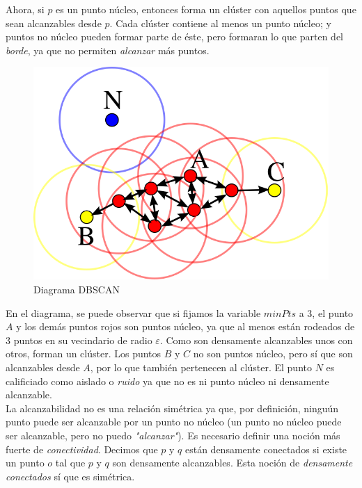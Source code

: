 \documentclass[a4paper, 12pt]{article}
\begin{document}
Ahora, si $p$ es un punto n\'ucleo, entonces forma un cl\'uster con aquellos puntos que sean alcanzables desde $p$. Cada cl\'uster contiene al menos un punto n\'ucleo; y puntos no n\'ucleo pueden formar parte de \'este, pero formaran lo que parten del \textit{borde}, ya que no permiten \textit{alcanzar} m\'as puntos. \\

\begin{figure}\label{fig:DBSCAN}
	\centering
	\includegraphics[scale=.5]{DBSCAN.png}
\caption{Diagrama DBSCAN}
\end{figure}

En el diagrama, se puede observar que si fijamos la variable $minPts$ a 3, el punto $A$ y los dem\'as puntos rojos son puntos n\'ucleo, ya que al menos est\'an rodeados de $3$ puntos en su vecindario de radio $\varepsilon$. Como son densamente alcanzables unos con otros, forman un cl\'uster. Los puntos $B$ y $C$ no son puntos n\'ucleo, pero s\'i que son alcanzables desde $A$, por lo que tambi\'en pertenecen al cl\'uster. El punto $N$ es calificiado como aislado o \textit{ruido} ya que no es ni punto n\'ucleo ni densamente alcanzable. \\

La alcanzabilidad no es una relaci\'on sim\'etrica ya que, por definici\'on, ningu\'un punto puede ser alcanzable por un punto no n\'ucleo (un punto no n\'ucleo puede ser alcanzable, pero no puedo \textit{"alcanzar"}). Es necesario definir una noci\'on m\'as fuerte de \textit{conectividad}. Decimos que $p$ y $q$ est\'an densamente conectados si existe un punto $o$ tal que $p$ y $q$ son densamente alcanzables. Esta noci\'on de \textit{densamente conectados} s\'i que es sim\'etrica.\\
\end{document}
